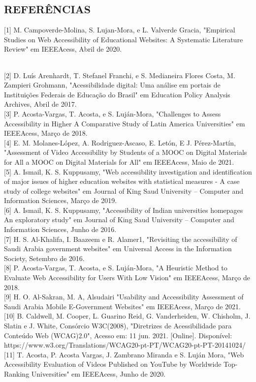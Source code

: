 \documentclass[a4paper]{article}
\begin{document}
\begin{titlepage}
\section*{REFERÊNCIAS}
\hspace{-0.05\textwidth}
\begin{minipage}{1\textwidth}
[1] M. Campoverde-Molina, S. Lujan-Mora, e L. Valverde Gracia, "Empirical Studies on Web Accessibility of Educational Websites: A Systematic Literature Review" em IEEEAcess, Abril de 2020.
\end{minipage}\\[0.5cm]
[2] D. Luís Arenhardt, T. Stefanel Franchi, e S. Medianeira Flores Costa, M. Zampieri Grohmann, "Acessibilidade digital: Uma análise em portais de Instituições Federais de Educação do Brasil" em Education Policy Analysis Archives, Abril de 2017.\\[0.5cm] [3] P. Acosta-Vargas, T. Acosta, e S. Luján-Mora, "Challenges to Assess Accessibility in Higher A Comparative Study of Latin America Universities" em IEEEAcess, Março de 2018.\\[0.5cm] [4] E. M. Molanes-López, A. Rodriguez-Ascaso, E. Letón, E J. Pérez-Martín, "Assessment of Video Accessibility by Students of a MOOC on Digital Materials for All a MOOC on Digital Materials for All" em IEEEAcess, Maio de 2021.\\[0.5cm] [5] A. Ismail, K. S. Kuppusamy, "Web accessibility investigation and identification of major issues of higher education websites with statistical measures - A case study of college websites" em Journal of King Saud University – Computer and Information Sciences, Março de 2019.\\[0.5cm] [6] A. Ismail, K. S. Kuppusamy, "Accessibility of Indian universities homepages An exploratory study" em Journal of King Saud University – Computer and Information Sciences, Junho de 2016.\\[0.5cm] [7] H. S. Al-Khalifa, I. Baazeem e R. Alamer1, "Revisiting the accessibility of Saudi Arabia government websites" em Universal Access in the Information Society, Setembro de 2016.\\[0.5cm] [8] P. Acosta-Vargas, T. Acosta, e S. Luján-Mora, "A Heuristic Method to Evaluate Web Accessibility for Users With Low Vision" em IEEEAcess, Março de 2018.\\[0.5cm] [9] H. O. Al-Sakran, M. A, Alsudairi "Usability and Accessibility Assessment of Saudi Arabia Mobile E-Government Websites" em IEEEAcess, Março de 2021.\\[0.5cm] [10] B. Caldwell, M. Cooper, L. Guarino Reid, G. Vanderheiden, W. Chisholm, J. Slatin e J. White, Consórcio W3C(2008), "Diretrizes de Acessibilidade para Conteúdo Web (WCAG)2.0", Acesso em: 11 jun. 2021. [Online]. Disponível: https://www.w3.org/Translations/WCAG20-pt-PT/WCAG20-pt-PT-20141024/\\[0.5cm] [11] T. Acosta, P. Acosta Vargas, J. Zambrano Miranda e S. Luján Mora, "Web Accessibility Evaluation of Videos Published on YouTube by Worldwide Top-Ranking Universities" em IEEEAcess, Junho de 2020.

\end{titlepage}
\end{document}
